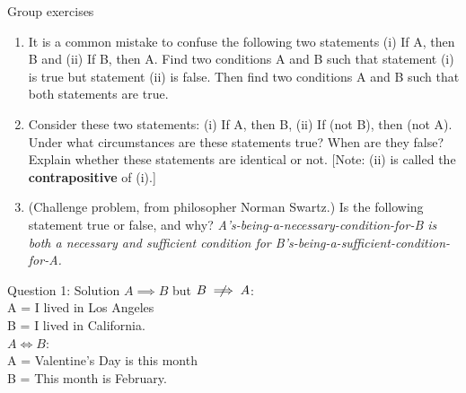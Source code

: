 \documentclass[10pt]{beamer}
\begin{document}
\begin{frame}{Group exercises}
\small 
\begin{enumerate}
	\item It is a common mistake to confuse the following two statements (i) If A, then B and (ii) If B, then A. Find two conditions A and B such that statement (i) is true but statement (ii) is false. Then find two conditions A and B such that both statements are true. 
	\item Consider these two statements: (i) If A, then B, (ii) If (not B), then (not A).  Under what circumstances are these statements true?  When are they false? Explain whether these statements are identical or not. \alert{[Note: (ii) is called the \textbf{contrapositive} of (i).]}
	\item (Challenge problem, from philosopher Norman Swartz.)  Is the following statement true or false, and why? \textit{A's-being-a-necessary-condition-for-B is both a necessary and sufficient condition for B's-being-a-sufficient-condition-for-A.}
\end{enumerate}
	
\end{frame}


\begin{frame}{Question 1: Solution}
$A \implies B$ but $B \centernot\implies A$: \\
A = I lived in Los Angeles \\
B = I lived in California. \\
\vfill 
$A \iff B$: \\
A = Valentine's Day is this month \\
B = This month is February. 
\end{frame}
\end{document}
